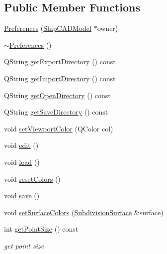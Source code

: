 \subsection*{Public Member Functions}
\begin{DoxyCompactItemize}
\item 
\hyperlink{classShipCAD_1_1Preferences_afd469134e34b7e1982efeb1e402fce3b}{Preferences} (\hyperlink{classShipCAD_1_1ShipCADModel}{Ship\-C\-A\-D\-Model} $\ast$owner)
\item 
\hyperlink{classShipCAD_1_1Preferences_ab38e15f8965b1cd69b80369bb16a0995}{$\sim$\-Preferences} ()
\item 
Q\-String \hyperlink{classShipCAD_1_1Preferences_a9673a7bf93112ff78b6c8ca5d7cc3a4b}{get\-Export\-Directory} () const 
\item 
Q\-String \hyperlink{classShipCAD_1_1Preferences_a275aac8dc6e72c021ad00ff68f2fba54}{get\-Import\-Directory} () const 
\item 
Q\-String \hyperlink{classShipCAD_1_1Preferences_ab1ac99acb5ceb37b5cf7f6b21f376f27}{get\-Open\-Directory} () const 
\item 
Q\-String \hyperlink{classShipCAD_1_1Preferences_a5ee1cbf3c572b9253cfe958055e0eb43}{get\-Save\-Directory} () const 
\item 
void \hyperlink{classShipCAD_1_1Preferences_ad120b46e68a08d7682aaeb351b4c179d}{set\-Viewport\-Color} (Q\-Color col)
\item 
void \hyperlink{classShipCAD_1_1Preferences_a326180a1551596a3a9f2709d31c9fb10}{edit} ()
\item 
void \hyperlink{classShipCAD_1_1Preferences_a70c1b8f3b9e117d67c3cd50c33f66f3a}{load} ()
\item 
void \hyperlink{classShipCAD_1_1Preferences_a2e7e496b3417148240994e51281b0858}{reset\-Colors} ()
\item 
void \hyperlink{classShipCAD_1_1Preferences_ab3f40207c39fe262a7ae16ca22b297b2}{save} ()
\item 
void \hyperlink{classShipCAD_1_1Preferences_a9c1e6e137131d41b962ae1cb4a943bd0}{set\-Surface\-Colors} (\hyperlink{classShipCAD_1_1SubdivisionSurface}{Subdivision\-Surface} \&surface)
\item 
int \hyperlink{classShipCAD_1_1Preferences_af474c1924b33adccb7299a95a768d610}{get\-Point\-Size} () const 
\begin{DoxyCompactList}\small\item\em get point size \end{DoxyCompactList}\item 

\end{DoxyCompactItemize}
